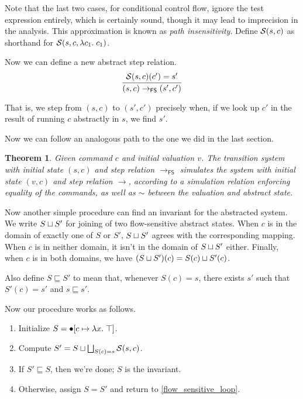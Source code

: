 \documentclass{amsbook}
\newtheorem{theorem}{Theorem}[chapter]
\theoremstyle{definition}
\theoremstyle{remark}
\numberwithin{section}{chapter}
\numberwithin{equation}{chapter}
\begin{document}
Note that the last two cases, for conditional control flow, ignore the test expression entirely, which is certainly sound, though it may lead to imprecision in the analysis.
This approximation is known as \emph{path insensitivity}.
Define $\mathcal S(s, c)$ as shorthand for $\mathcal S(s, c, \lambda c_1. \; c_1)$.

Now we can define a new abstract step relation.
$$\infer{(s, c) \to_\mathsf{FS} (s', c')}{
  \absstepo{s}{c}(c') = s'
}$$

That is, we step from $(s, c)$ to $(s', c')$ precisely when, if we look up $c'$ in the result of running $c$ abstractly in $s$, we find $s'$.

Now we can follow an analogous path to the one we did in the last section.

\begin{theorem}\label{flow_sensitive_abstraction}
  \abstraction
  Given command $c$ and initial valuation $v$.  The transition system with initial state $(s, c)$ and step relation $\to_\mathsf{FS}$ simulates the system with initial state $(v, c)$ and step relation $\to$, according to a simulation relation enforcing equality of the commands, as well as $\sim$ between the valuation and abstract state.
\end{theorem}

Now another simple procedure can find an invariant for the abstracted system.
We write $S \sqcup S'$ for joining of two flow-sensitive abstract states.
When $c$ is in the domain of exactly one of $S$ or $S'$, $S \sqcup S'$ agrees with the corresponding mapping.
When $c$ is in neither domain, it isn't in the domain of $S \sqcup S'$ either.
Finally, when $c$ is in both domains, we have $(S \sqcup S')(c) = S(c) \sqcup S'(c)$.

Also define $S \sqsubseteq S'$ to mean that, whenever $S(c) = s$, there exists $s'$ such that $S'(c) = s'$ and $s \sqsubseteq s'$.

Now our procedure works as follows.

\begin{enumerate}
\item Initialize $S = \bullet[c \mapsto \lambda x. \; \top]$.
\item \label{flow_sensitive_loop}Compute $S' = S \sqcup \bigsqcup_{S(c) = s} \mathcal S(s, c)$.
\item If $S' \sqsubseteq S$, then we're done; $S$ is the invariant.
\item Otherwise, assign $S = S'$ and return to \ref{flow_sensitive_loop}.
\end{enumerate}
\end{document}
